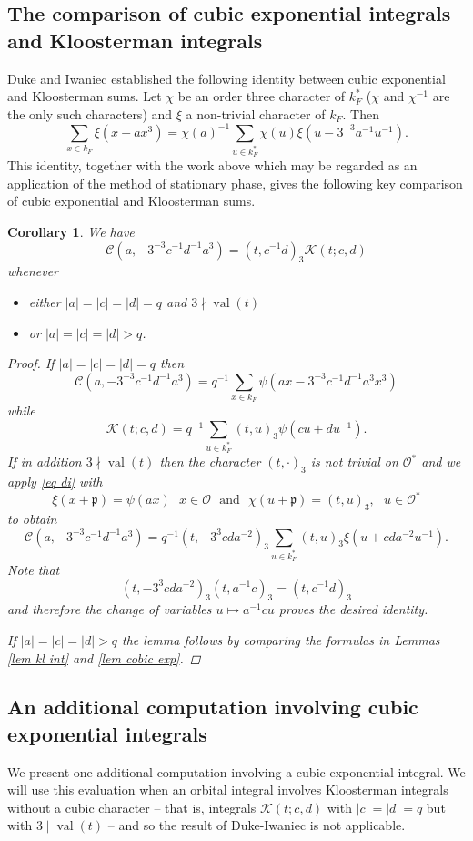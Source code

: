 \documentclass[12pt]{amsart}
\newcommand{\abs}[1]{\left|{#1}\right|}
\newcommand{\p}{\mathfrak{p}}
\renewcommand{\O}{\mathcal{O}}
\newcommand{\val}{{\operatorname{val}}}
\newcommand{\Kl}{\mathcal{K}}
\newcommand{\Cu}{\mathcal{C}}
\newtheorem{corollary}[theorem]{Corollary}%
\theoremstyle{remark}
\begin{document}
\subsection{The comparison of cubic exponential integrals and Kloosterman integrals}\label{cubic-comparison-123}
Duke and Iwaniec \cite{MR1210520} established the following identity between cubic exponential and Kloosterman sums.
Let $\chi$ be an order three character of $k_F^*$ ($\chi$ and $\chi^{-1}$ are the only such characters) and $\xi$ a non-trivial character of $k_F$. Then
\begin{equation}\label{eq di}
\sum_{x\in k_F} \xi(x+ax^3)= \chi(a)^{-1}\sum_{u\in k_F^*}\chi(u)\xi(u-3^{-3}a^{-1}u^{-1}).
\end{equation}
This identity, together with the work above which may be regarded as an application of the method of stationary phase, gives
the following key comparison of cubic exponential and Kloosterman sums.
\begin{corollary}\label{cor di}
We have
\[
\Cu(a,-3^{-3}c^{-1}d^{-1}a^3)=(t,c^{-1}d)_3\Kl(t;c,d)
\]
whenever
\begin{itemize}
\item either $\abs{a}=\abs{c}=\abs{d}=q$ and $3\nmid \val(t)$
\item or $\abs{a}=\abs{c}=\abs{d}>q$.
\end{itemize}
\begin{proof}
If $\abs{a}=\abs{c}=\abs{d}=q$ then
\[
\Cu(a,-3^{-3}c^{-1}d^{-1}a^3)=q^{-1}\sum_{x\in k_F}\psi(ax-3^{-3}c^{-1}d^{-1}a^3x^3) 
\]
while
\[
\Kl(t;c,d)=q^{-1}\sum_{u\in k_F^*}(t,u)_3\psi(cu+du^{-1}).
\]
If in addition $3\nmid \val(t)$ then the character $(t,\cdot)_3$ is not trivial on $\O^*$ and we apply \eqref{eq di} with 
\[
\xi(x+\p)=\psi(ax)\ \ \ x\in \O \ \ \  \text{and} \ \ \ \chi(u+\p)=(t,u)_3, \ \ \ u\in\O^*
\]
to obtain
\[
\Cu(a,-3^{-3}c^{-1}d^{-1}a^3)=q^{-1}(t,-3^3cda^{-2})_3\sum_{u\in k_F^*}(t,u)_3\xi(u+cda^{-2}u^{-1}). 
\]
Note that 
\[
(t,-3^3cda^{-2})_3(t,a^{-1}c)_3=(t,c^{-1}d)_3
\]
and therefore the change of variables $u\mapsto a^{-1}cu$ proves the desired identity. 

If $\abs{a}=\abs{c}=\abs{d}>q$ the lemma follows by comparing the formulas in Lemmas \ref{lem kl int} and \ref{lem cobic exp}.
\end{proof}
\end{corollary}

\subsection{An additional computation involving cubic exponential integrals}\label{cubic-additional-123}
We present one additional computation involving a cubic exponential integral.
We will use this evaluation when an orbital integral involves Kloosterman integrals without a cubic character -- that is, integrals $\Kl(t;c,d)$ with 
$\abs{c}=\abs{d}=q$ but with $3\mid \val(t)$ -- 
and so the result of Duke-Iwaniec is not applicable. 
\end{document}
